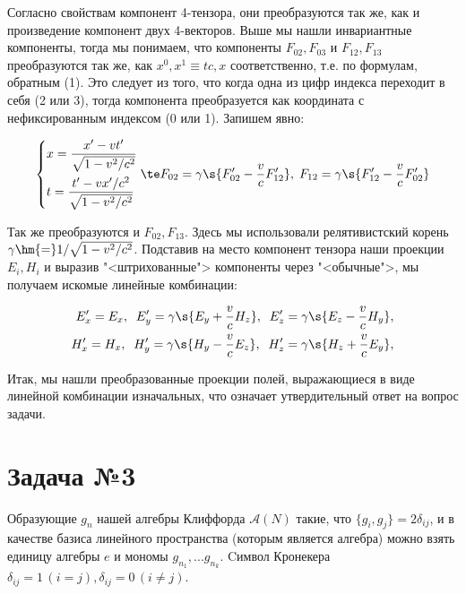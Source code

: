 \documentclass[12pt]{kiarticle}
\begin{document}
Согласно свойствам компонент 4-тензора, они преобразуются так же, как и произведение компонент двух 4-векторов. Выше мы нашли инвариантные компоненты, тогда мы понимаем, что компоненты $ F_{02}, F_{03} $ и $ F_{12}, F_{13} $ преобразуются так же, как $ x^0, x^1 \equiv tc, x $ соответственно, т.е. по формулам, обратным (1). Это следует из того, что когда одна из цифр индекса переходит в себя (2 или 3), тогда компонента преобразуется как координата с нефиксированным индексом (0 или 1).  Запишем явно:

\begin{equation}
\left\{
\begin{aligned}
&x = \dfrac{x' - vt'}{\sqrt{1-v^2/c^2}} \\
&t = \dfrac{t' - vx'/c^2}{\sqrt{1-v^2/c^2}} \\
\end{aligned}
\right.
\te
 F_{02} = \gamma \s{F'_{02} - \frac{v}{c}F'_{12}}, \; F_{12} = \gamma  \s{F'_{12} -\frac{v}{c} F'_{02}}
\end{equation}

Так же преобразуются и $ F_{02}, F_{13} $. Здесь мы использовали релятивистский корень $ \gamma \hm{=} 1/\sqrt{1 - v^2/c^2} $. Подставив на место компонент тензора наши проекции $ E_i, H_i $ и выразив "<штрихованные"> компоненты через "<обычные">, мы получаем искомые линейные комбинации:

\begin{equation}\label{}
\begin{aligned}
E'_x = E_x, \; \; E'_y = \gamma \s{E_y + \frac{v}{c}H_{z}}, \; \; E'_z = \gamma \s{E_z - \frac{v}{c}H_{y}}, \\
H'_x = H_x, \; \; H'_y = \gamma \s{H_y - \frac{v}{c}E_{z}}, \; \; H'_z = \gamma \s{H_z + \frac{v}{c}E_{y}},
\end{aligned}
\end{equation}

Итак, мы нашли преобразованные проекции полей, выражающиеся в виде линейной комбинации изначальных, что означает утвердительный ответ на вопрос задачи.









\section{Задача №3}

Образующие $ g_n $ нашей алгебры Клиффорда $ \mathscr{A}(N) $ такие, что $ \{g_i, g_j\} = 2\delta_{ij} $, и в качестве базиса линейного пространства (которым является алгебра) можно взять единицу алгебры $ e $ и мономы $ g_{n_1}, ... g_{n_k} $. Cимвол Кронекера $ \delta_{ij} = 1\, (i = j), \delta_{ij} = 0\, (i \neq j) $.
\end{document}
